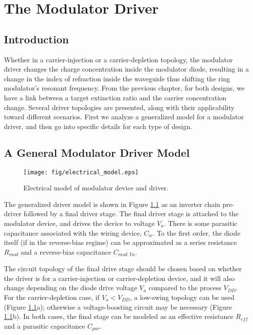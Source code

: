 
\chapter{The Modulator Driver}

\section{Introduction}

Whether in a carrier-injection or a carrier-depletion topology, the modulator driver changes the charge concentration inside the modulator diode, resulting in a change in the index of refraction inside the waveguide thus shifting the ring modulator's resonant frequency.  From the previous chapter, for both designs, we have a link between a target extinction ratio and the carrier concentration change.  Several driver topologies are presented, along with their applicability toward different scenarios.  First we analyze a generalized model for a modulator driver, and then go into specific details for each type of design.

\section{A General Modulator Driver Model}

	\begin{figure}[H]
		\begin{center}
		\texttt{[image: fig/electrical\_model.eps]} 
		\caption{\label{fig:electrical_model}Electrical model of modulator device and driver.}	
		\end{center}
    \vspace{-10pt}
	\end{figure}

The generalized driver model is shown in Figure \ref{fig:electrical_model} as an inverter 
chain pre-driver followed by a final driver stage.  The final driver stage is attached to the modulator device, and drives the device to voltage $V_a$.  There is some parasitic capacitance associated with the wiring device, $C_{w}$.  To the first order, the diode itself (if in the reverse-bias regime) can be approximated as a series resistance $R_{mod}$ and a reverse-bias capacitance $C_{mod,Va}$. 

The circuit topology of the final drive stage should be chosen based on whether the driver is for a carrier-injection or carrier-depletion device, and it will also change depending on the diode drive voltage $V_a$ compared to the process $V_{DD}$.  For the carrier-depletion case, if $V_a < V_{DD}$, a low-swing topology can be used (Figure \ref{fig:electrical_model}a); 
otherwise a voltage-boosting circuit may be necessary (Figure \ref{fig:electrical_model}b).  
In both cases, the final stage can be modeled as an effective resistance $R_{eff}$ and a parasitic capacitance $C_{par}$.

